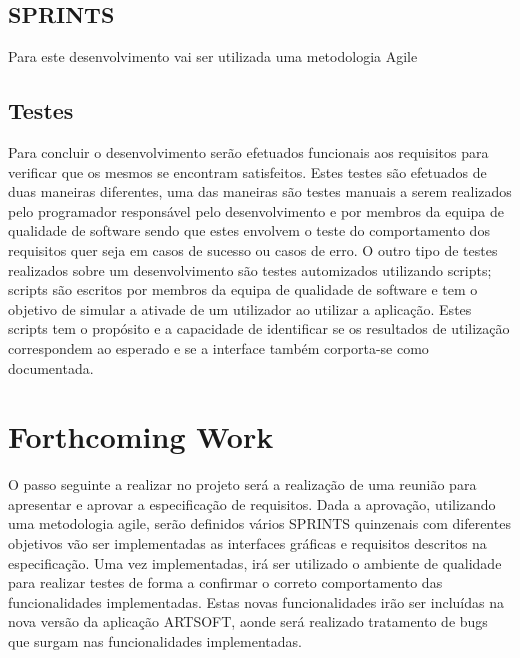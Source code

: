 \documentclass[sigplan]{acmart}
\begin{document}
\subsection{SPRINTS}
Para este desenvolvimento vai ser utilizada uma metodologia Agile  


\subsection{Testes}

Para concluir o desenvolvimento serão efetuados funcionais aos requisitos para verificar que os mesmos se encontram satisfeitos. Estes testes são efetuados de duas maneiras diferentes, uma das maneiras são testes manuais a serem realizados pelo programador responsável pelo desenvolvimento e por membros da equipa de qualidade de software sendo que estes envolvem o teste do comportamento dos requisitos quer seja em casos de sucesso ou casos de erro. O outro tipo de testes realizados sobre um desenvolvimento são testes automizados utilizando scripts; scripts são escritos por membros da equipa de qualidade de software e tem o objetivo de simular a ativade de um utilizador ao utilizar a aplicação. Estes scripts tem o propósito e a capacidade de identificar se os resultados de utilização correspondem ao esperado e se a interface também corporta-se como documentada.

\section{Forthcoming Work} \label{sec:forthcomingwork}

O passo seguinte a realizar no projeto será a realização de uma reunião para apresentar e aprovar a especificação de requisitos. Dada a aprovação, utilizando uma metodologia agile, serão definidos vários SPRINTS quinzenais com diferentes objetivos vão ser implementadas as interfaces gráficas e requisitos descritos na especificação. Uma vez implementadas, irá ser utilizado o ambiente de qualidade para realizar testes de forma a confirmar o correto comportamento das funcionalidades implementadas. Estas novas funcionalidades irão ser incluídas na nova versão da aplicação ARTSOFT, aonde será realizado tratamento de bugs que surgam nas funcionalidades implementadas.



\end{document}
